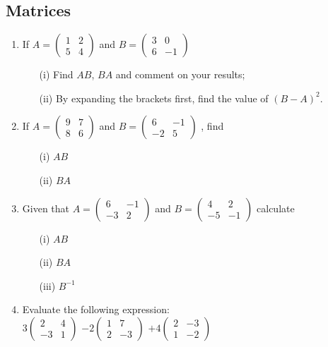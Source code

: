 	\subsection{Matrices}
\begin{enumerate}

	\item If $A = 
	\begin{pmatrix}
	1 & 2 \\
	5 & 4
	\end{pmatrix}$ and $B = 
	\begin{pmatrix}
	3 & 0 \\
	6 & -1
	\end{pmatrix}$
	\begin{itemize}
	\item[(i)] Find $AB$, $BA$ and comment on your results;
	\item[(ii)] By expanding the brackets first, find the value of $(B - A)^2$.
	\end{itemize}

	\item If $A = 
	\begin{pmatrix}
	9 & 7 \\
	8 & 6
	\end{pmatrix}$
	and $B = 
	\begin{pmatrix}
	6 & -1 \\
	-2 & 5
	\end{pmatrix}$
	, find
	\begin{itemize}
	\item[(i)] $AB$
	\item[(ii)] $BA$
	\end{itemize}
	
	\item Given that $A = 
	\begin{pmatrix}
	6 & -1 \\
	-3 & 2
	\end{pmatrix}$
	and $B = 
	\begin{pmatrix}
	4 & 2 \\
	-5 & -1
	\end{pmatrix}$
	calculate 
	\begin{itemize}
	\item[(i)] $AB$
	\item[(ii)] $BA$
	\item[(iii)] $B^{-1}$
	\end{itemize}
	
	\item Evaluate the following expression:\\
	$3 
	\begin{pmatrix}
	2 & 4 \\
	-3 & 1
	\end{pmatrix}$
	$ - 2 
	\begin{pmatrix}
	1 & 7 \\
	2 & -3
	\end{pmatrix}$
	$ + 4 
	\begin{pmatrix}
	2 & -3 \\
	1 & -2
	\end{pmatrix}$
	

\end{enumerate}
